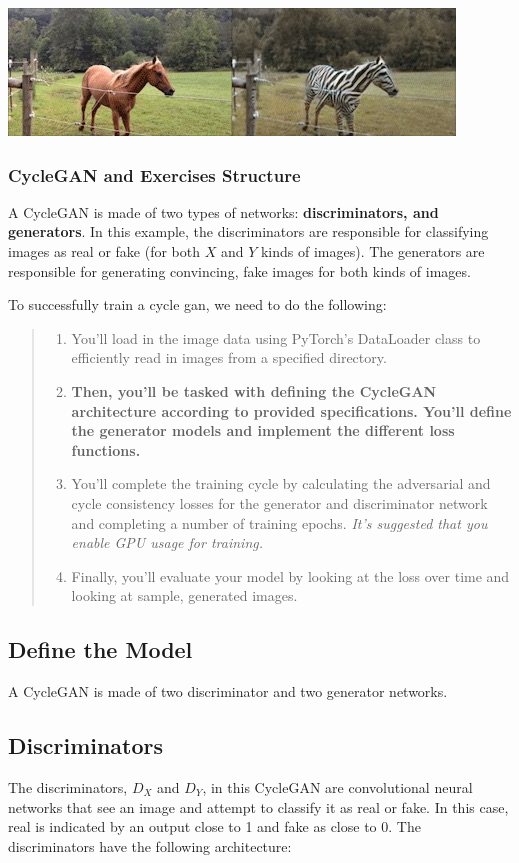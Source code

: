 \includegraphics[width=1\linewidth]{img//genAdvNet//image2image/horse2zebra.jpg}

\subsubsection{CycleGAN and Exercises Structure}

A CycleGAN is made of two types of networks: \textbf{discriminators, and
generators}. In this example, the discriminators are responsible for
classifying images as real or fake (for both \(X\) and \(Y\) kinds of
images). The generators are responsible for generating convincing, fake
images for both kinds of images.

To successfully train a cycle gan, we need to do the following:

\begin{quote}
\begin{enumerate}
\item You'll load in the image data using PyTorch's DataLoader class to efficiently read in images from a specified directory.
\item \textbf{Then, you'll be tasked with defining the CycleGAN architecture according to provided specifications. You'll define the generator models and implement the different loss functions.}
\item You'll complete the training cycle by calculating the adversarial and cycle consistency losses for the generator and discriminator network and completing a number of training epochs. \emph{It's suggested that you enable GPU usage for training.}
\item Finally, you'll evaluate your model by looking at the loss over time and looking at sample, generated images.
\end{enumerate}
\end{quote}
\subsection{Define the Model}
A CycleGAN is made of two discriminator and two generator networks.
\subsection{Discriminators}
The discriminators, \(D_X\) and \(D_Y\), in this CycleGAN are
convolutional neural networks that see an image and attempt to classify
it as real or fake. In this case, real is indicated by an output close
to 1 and fake as close to 0. The discriminators have the following
architecture:

